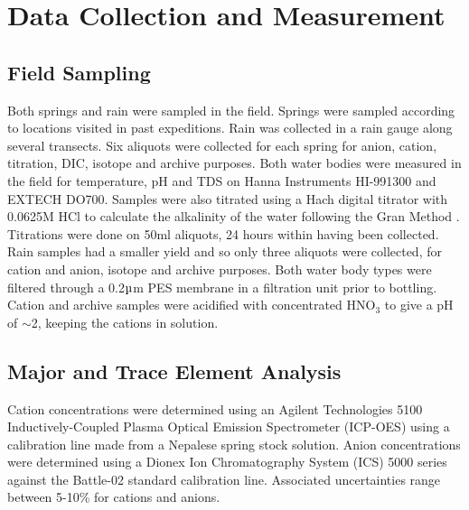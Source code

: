 
\newpage

\section{Data Collection and Measurement}


\subsection{Field Sampling}
Both springs and rain were sampled in the field. Springs were sampled according to locations visited in past expeditions. Rain was collected in a rain gauge along several transects. Six aliquots were collected for each spring for anion, cation, titration, DIC, isotope and archive purposes. Both water bodies were measured in the field for temperature, pH and TDS on Hanna Instruments HI-991300 and EXTECH DO700. Samples were also titrated using a Hach digital titrator with 0.0625M HCl to calculate the alkalinity of the water following the Gran Method \parencite{gran1952}. Titrations were done on 50ml aliquots, 24 hours within having been collected.  Rain samples had a smaller yield and so only three aliquots were collected, for cation and anion, isotope and archive purposes. Both water body types were filtered through a 0.2$\micro$m PES membrane in a filtration unit prior to bottling. Cation and archive samples were acidified with concentrated HNO$_3$ to give a pH of $\sim$2, keeping the cations in solution. 


\subsection{Major and Trace Element Analysis}

Cation concentrations were determined using an Agilent Technologies 5100 Inductively-Coupled Plasma Optical Emission Spectrometer (ICP-OES) using a calibration line made from a Nepalese spring stock solution. Anion concentrations were determined using a Dionex Ion Chromatography System (ICS) 5000 series against the Battle-02 standard calibration line. Associated uncertainties range between 5-10\% for cations and anions.



